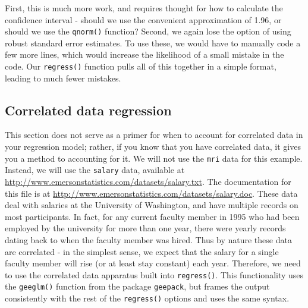 \documentclass[landscape]{article}
\begin{document}
First, this is much more work, and requires thought for how to calculate the confidence interval - should we use the convenient approximation of 1.96, or should we use the \texttt{qnorm()} function? Second, we again lose the option of using robust standard error estimates. To use these, we would have to manually code a few more lines, which would increase the likelihood of a small mistake in the code. Our \texttt{regress()} function pulls all of this together in a simple format, leading to much fewer mistakes.

\subsection{Correlated data regression}
This section does not serve as a primer for when to account for correlated data in your regression model; rather, if you know that you have correlated data, it gives you a method to accounting for it. We will not use the \texttt{mri} data for this example. Instead, we will use the \texttt{salary} data, available at \url{http://www.emersonstatistics.com/datasets/salary.txt}. The documentation for this file is at \url{http://www.emersonstatistics.com/datasets/salary.doc}. These data deal with salaries at the University of Washington, and have multiple records on most participants. In fact, for any current faculty member in 1995 who had been employed by the university for more than one year, there were yearly records dating back to when the faculty member was hired. Thus by nature these data are correlated - in the simplest sense, we expect that the salary for a single faculty member will rise (or at least stay constant) each year. Therefore, we need to use the correlated data apparatus built into \texttt{regress()}. This functionality uses the \texttt{geeglm()} function from the package \texttt{geepack}, but frames the output consistently with the rest of the \texttt{regress()} options and uses the same syntax.
\end{document}
